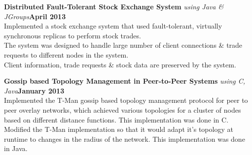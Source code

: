 \documentclass[10pt]{article}
\begin{document}

{\bf Distributed Fault-Tolerant Stock Exchange System} \textit{using Java \& JGroups}\hfill{\bf April 2013} \smallskip \\
Implemented a stock exchange system that used fault-tolerant, virtually synchronous replicas to perform stock trades. \smallskip \\
The system was designed to handle large number of client connections \& trade requests to different nodes in the system. \smallskip \\
Client information, trade requests \& stock data are preserved by the system. %



{\bf Gossip based Topology Management in Peer-to-Peer Systems} \textit{using C, Java}\hfill{\bf January 2013} \smallskip \\
Implemented the T-Man gossip based topology management protocol for peer to peer overlay networks, which achieved various topologies for a cluster of nodes based on different distance functions. This implementation was done in C. \smallskip \\
Modified the T-Man implementation so that it would adapt it's topology at runtime to changes in the radius of the network. This implementation was done in Java. %
\end{document}
